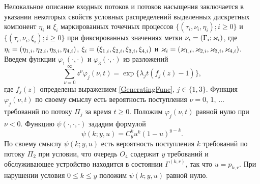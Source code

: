\documentclass[12pt]{extarticle}
\theoremstyle{theorem}
\theoremstyle{remark}
\renewcommand*{\hm}[1]{#1\nobreak\discretionary{}%
	{\hbox{$\mathsurround=0pt #1$}}{}}%
\begin{document}
Нелокальное описание входных потоков и потоков насыщения заключается  в указании некоторых свойств условных распределений выделенных дискретных компонент $\eta_i$ и $\xi_i$ маркированных точечных процессов \linebreak $\{(\tau_i, \nu_i, \eta_i); i\geqslant 0\}$ и $\{(\tau_i, \nu_i, \xi_i); i\geqslant 0\}$ при фиксированных значениях метки $\nu_i \hm= (\Gamma_i;\varkappa_i)$, где $\eta_i\hm=(\eta_{1,i}, \eta_{2,i}, \eta_{3,i}, \eta_{4,i})$, $\xi_i \hm= (\xi_{1,i}, \xi_{2,i}, \xi_{3,i}, \xi_{4,i})$ и $\varkappa_i \hm= (\varkappa_{1,i},\varkappa_{2,i},\varkappa_{3,i},\varkappa_{4,i})$. 
Введем функции $\varphi_1(\cdot,\cdot)$ и $\varphi_3(\cdot,\cdot)$ из разложений 
\begin{equation*}
\sum_{\nu=0}^{\infty} z^\nu\varphi_j(\nu,t) = \exp\{\lambda_j t (f_j(z)-1)\},
\end{equation*}
где $f_j(z)$ определены выражением \eqref{GeneratingFunc}, $j \in \{1,3\}$. Функция $\varphi_j(\nu,t)$ по своему смыслу есть вероятность поступления $\nu=0$, $1$, $\ldots$ требований по потоку $\Pi_j$ за время $t \geqslant 0$. Положим $\varphi_j(\nu,t)$ равной нулю при $\nu < 0$. Функцию $\psi(\cdot,\cdot,\cdot)$ зададим формулой
\begin{equation*}
\psi(k;y,u)=C_y^k u^k (1-u)^{y-k}.	
\end{equation*}
По своему смыслу $\psi(k;y,u)$ есть вероятность поступления $k$ требований по потоку $\Pi_2$ при условии, что очередь $O_4$ содержит $y$ требований и обслуживающее устройство находится в состоянии $\Gamma^{(k,r)}$, так что $u=p_{k,r}$. При нарушении условия $ 0\leqslant k \leqslant y$ положим $\psi(k;y,u)$ равной нулю.
\end{document}
